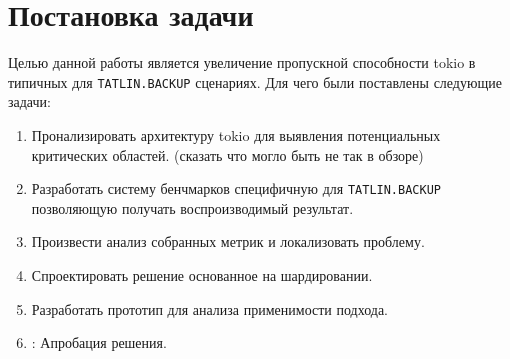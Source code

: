 
\section{Постановка задачи}
\label{sec:task}

Целью данной работы является увеличение пропускной способности tokio в типичных для \verb|TATLIN.BACKUP| сценариях. Для чего были поставлены следующие задачи:

\begin{enumerate}
    \item Пронализировать архитектуру tokio для выявления потенциальных критических областей. (сказать что могло быть не так в обзоре)
    \item Разработать систему бенчмарков специфичную для \verb|TATLIN.BACKUP| позволяющую получать воспроизводимый результат.
    \item Произвести анализ собранных метрик и локализовать проблему.
    \item Спроектировать решение основанное на шардировании.
    \item Разработать прототип для анализа применимости подхода.
    \item {}: Апробация решения.
\end{enumerate}
